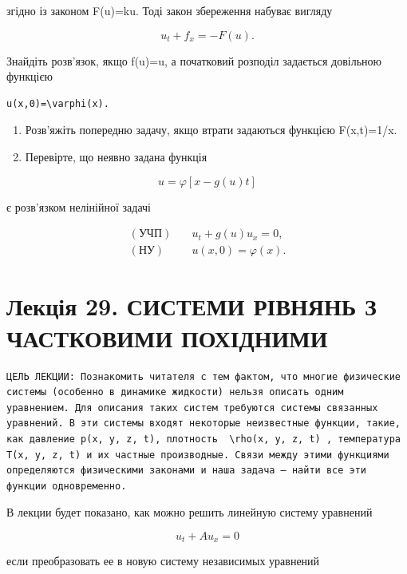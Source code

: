\documentclass[
  ukrainian,
]{article}
\begin{document}
згідно із законом F(u)=ku. Тоді закон збереження набуває вигляду

\[
u_t + f_x = -F(u).
\]

Знайдіть розв'язок, якщо f(u)=u, а початковий розподіл задається
довільною функцією

\begin{verbatim}
u(x,0)=\varphi(x).
\end{verbatim}

\begin{enumerate}
\def\labelenumi{\arabic{enumi}.}
\setcounter{enumi}{3}
\item
  Розв'яжіть попередню задачу, якщо втрати задаються функцією
  F(x,t)=1/x.
\item
  Перевірте, що неявно задана функція
\end{enumerate}

\[
u = \varphi[x-g(u)t]
\]

є розв'язком нелінійної задачі

\[
\begin{aligned}
(\text{УЧП})\quad & u_t + g(u)u_x = 0,\\
(\text{НУ})\quad & u(x,0)=\varphi(x).
\end{aligned}
\]

\section{Лекція 29. СИСТЕМИ РІВНЯНЬ З ЧАСТКОВИМИ
ПОХІДНИМИ}\label{ux43bux435ux43aux446ux456ux44f-29.-ux441ux438ux441ux442ux435ux43cux438-ux440ux456ux432ux43dux44fux43dux44c-ux437-ux447ux430ux441ux442ux43aux43eux432ux438ux43cux438-ux43fux43eux445ux456ux434ux43dux438ux43cux438}

\begin{verbatim}
ЦЕЛЬ ЛЕКЦИИ: Познакомить читателя с тем фактом, что многие физические системы (особенно в динамике жидкости) нельзя описать одним уравнением. Для описания таких систем требуются системы связанных уравнений. В эти системы входят некоторые неизвестные функции, такие, как давление p(x, y, z, t), плотность  \rho(x, y, z, t) , температура T(x, y, z, t) и их частные производные. Связи между этими функциями определяются физическими законами и наша задача — найти все эти функции одновременно.
\end{verbatim}

В лекции будет показано, как можно решить линейную систему уравнений

\[
u_t + Au_x = 0
\]

если преобразовать ее в новую систему независимых уравнений
\end{document}
